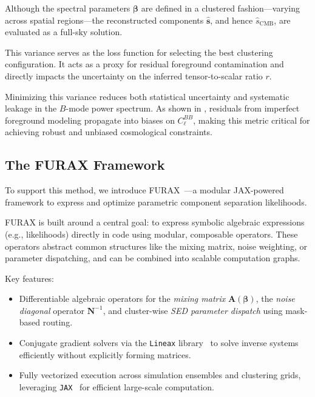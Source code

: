 \documentclass[%
 reprint,
bibnotes,
 amsmath,amssymb,
 aps,
floatfix, 
]{revtex4-2}
\begin{document}
Although the spectral parameters \( \boldsymbol{\beta} \) are defined in a clustered fashion—varying across spatial regions—the reconstructed components \( \hat{\mathbf{s}} \), and hence \( \hat{s}_{\mathrm{CMB}} \), are evaluated as a full-sky solution.

This variance serves as the loss function for selecting the best clustering configuration. It acts as a proxy for residual foreground contamination and directly impacts the uncertainty on the inferred tensor-to-scalar ratio \( r \).

Minimizing this variance reduces both statistical uncertainty and systematic leakage in the \( B \)-mode power spectrum. As shown in \citep{Errard2015}, residuals from imperfect foreground modeling propagate into biases on \( C_\ell^{BB} \), making this metric critical for achieving robust and unbiased cosmological constraints.

\subsection{The FURAX Framework}



To support this method, we introduce \textsc{FURAX}~\citep{FURAX}---a modular JAX-powered framework to express and optimize parametric component separation likelihoods.

FURAX is built around a central goal: to express symbolic algebraic expressions (e.g., likelihoods) directly in code using modular, composable operators. These operators abstract common structures like the mixing matrix, noise weighting, or parameter dispatching, and can be combined into scalable computation graphs.

Key features:
\begin{itemize}
    \item Differentiable algebraic operators for the \textit{mixing matrix} \( \mathbf{A}(\boldsymbol{\beta}) \), the \textit{noise diagonal} operator \( \mathbf{N}^{-1} \), and cluster-wise \textit{SED parameter dispatch} using mask-based routing.
    \item Conjugate gradient solvers via the \texttt{Lineax} library~\citep{lineax} to solve inverse systems efficiently without explicitly forming matrices.
    \item Fully vectorized execution across simulation ensembles and clustering grids, leveraging \texttt{JAX}~\citep{JAX} for efficient large-scale computation.
\end{itemize}
\end{document}
